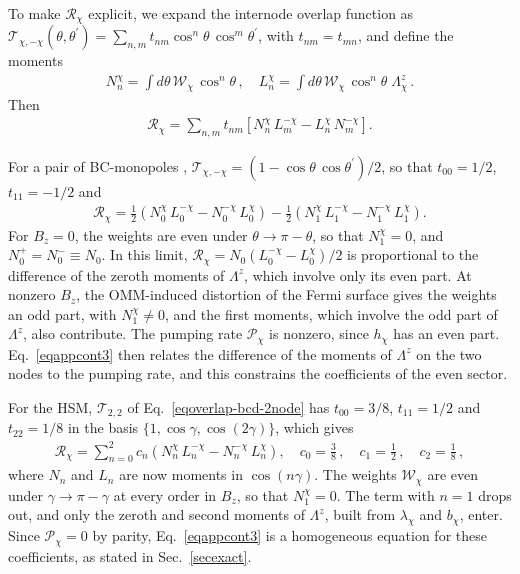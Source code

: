 \documentclass[aps,prb,onecolumn,nofootinbib,citeautoscript,10pt]{revtex4-2}
\begin{document}
To make $\mathcal R_\chi$ explicit, we expand the internode overlap function as $\mathcal T_{\chi,-\chi}(\theta,\theta^\prime)=\sum_{n,m}t_{nm}\cos^n\theta\,\cos^m\theta^\prime$, with $t_{nm}=t_{mn}$, and define the moments
\begin{align}
N^\chi_n=\int d\theta\,\mathcal W_\chi\,\cos^n\theta \,, \quad
L^\chi_n=\int d\theta\,\mathcal W_\chi\,\cos^n\theta\;\Lambda^z_\chi \,.
\end{align}
Then
\begin{align}
\label{eqappcont4}
\mathcal R_\chi = \sum_{n,m}t_{nm}\left[N^\chi_n\,L^{-\chi}_m - L^\chi_n\,N^{-\chi}_m\right] .
\end{align}

For a pair of BC-monopoles \cite{timm}, $\mathcal T_{\chi,-\chi}=(1-\cos\theta\,\cos\theta^\prime)/2$, so that $t_{00}=1/2$, $t_{11}=-1/2$ and
\begin{align}
\mathcal R_\chi = \frac{1}{2}\left(N^\chi_0\,L^{-\chi}_0 - N^{-\chi}_0\,L^\chi_0\right)
-\frac{1}{2}\left ( N^\chi_1\,L^{-\chi}_1 - N^{-\chi}_1\,L^\chi_1\right ).
\end{align}
For $B_z=0$, the weights are even under $\theta\to\pi-\theta$, so that $N^\chi_1=0$, and $N^+_0=N^-_0\equiv N_0$. In this limit, $\mathcal R_\chi=N_0\left(L^{-\chi}_0-L^\chi_0\right)/2$ is proportional to the difference of the zeroth moments of $\Lambda^z$, which involve only its even part. At nonzero $B_z$, the OMM-induced distortion of the Fermi surface gives the weights an odd part, with $N^\chi_1\neq0$, and the first moments, which involve the odd part of $\Lambda^z$, also contribute. The pumping rate $\mathcal P_\chi$ is nonzero, since $h_\chi$ has an even part. Eq.~\eqref{eqappcont3} then relates the difference of the moments of $\Lambda^z$ on the two nodes to the pumping rate, and this constrains the coefficients of the even sector.

For the HSM, $\mathcal T_{2,2}$ of Eq.~\eqref{eqoverlap-bcd-2node} has $t_{00}=3/8$, $t_{11}=1/2$ and $t_{22}=1/8$ in the basis $\{1,\cos\gamma,\cos(2\gamma)\}$, which gives
\begin{align}
\mathcal R_\chi = \sum_{n=0}^{2}c_n\left ( N^\chi_n\,L^{-\chi}_n - N^{-\chi}_n\,L^\chi_n \right ) , \quad
c_0=\frac{3}{8}\,, \quad c_1=\frac{1}{2}\,, \quad c_2=\frac{1}{8}\,,
\end{align}
where $N_n$ and $L_n$ are now moments in $\cos(n\gamma)$. The weights $\mathcal W_\chi$ are even under $\gamma\to\pi-\gamma$ at every order in $B_z$, so that $N^\chi_1=0$. The term with $n=1$ drops out, and only the zeroth and second moments of $\Lambda^z$, built from $\lambda_\chi$ and $b_\chi$, enter. Since $\mathcal P_\chi=0$ by parity, Eq.~\eqref{eqappcont3} is a homogeneous equation for these coefficients, as stated in Sec.~\ref{secexact}.

 


\end{document}
